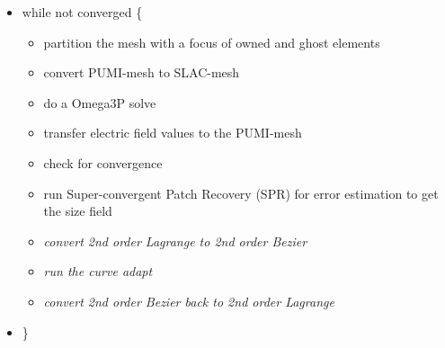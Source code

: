 \documentclass[review,authoryear,12pt]{elsarticle_summary_report}
\begin{document}
\begin{itemize}
  \item[] while not converged \{
   \begin{itemize}
          \item partition the mesh with a focus of owned and ghost elements
          \item convert PUMI-mesh to SLAC-mesh
	  \item do a Omega3P solve 
	  \item transfer electric field values to the PUMI-mesh
          \item check for convergence
          \item run Super-convergent Patch Recovery (SPR) for error estimation to get the size field
	  \item \textit{convert 2nd order Lagrange to 2nd order Bezier} %
	  \item \textit{run the curve adapt}
	  \item \textit{convert 2nd order Bezier back to 2nd order Lagrange} %
   \end{itemize}

 \item[] \}
\end{itemize}
\end{document}
